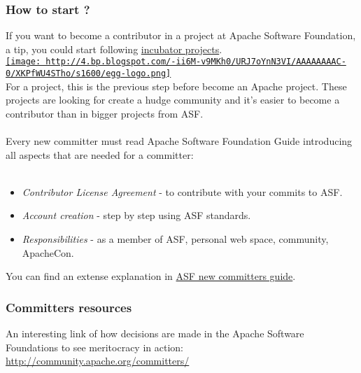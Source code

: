 \subsubsection{ How to start ?} If you want to become a contributor in a project at Apache Software Foundation, a tip, you could start following \href{http://incubator.apache.org/}{incubator projects}.
\\\href{http://4.bp.blogspot.com/-ii6M-v9MKh0/URJ7oYnN3VI/AAAAAAAAC-0/XKPfWU4STho/s1600/egg-logo.png}{
\texttt{[image: http://4.bp.blogspot.com/-ii6M-v9MKh0/URJ7oYnN3VI/AAAAAAAAC-0/XKPfWU4STho/s1600/egg-logo.png]}}
\\ For a project, this is the previous step before become an Apache project. These projects are looking for create a hudge community and it's easier to become a contributor than in bigger projects from ASF.
\\
\\ Every new committer must read Apache Software Foundation Guide introducing all aspects that are needed for a committer:
\\
\\
\begin{itemize}
	\item \textit{Contributor License Agreement} - to contribute with your commits to ASF.
	\item \textit{Account creation} - step by step using ASF standards.
	\item \textit{Responsibilities} - as a member of ASF, personal web space, community, ApacheCon.
\end{itemize} You can find an extense explanation in \href{http://www.apache.org/dev/new-committers-guide.html}{ASF new committers guide}.

\subsubsection{ Committers resources} An interesting link of how decisions are made in the Apache Software Foundations to see meritocracy in action:
\\\href{http://community.apache.org/committers/}{http://community.apache.org/committers/}